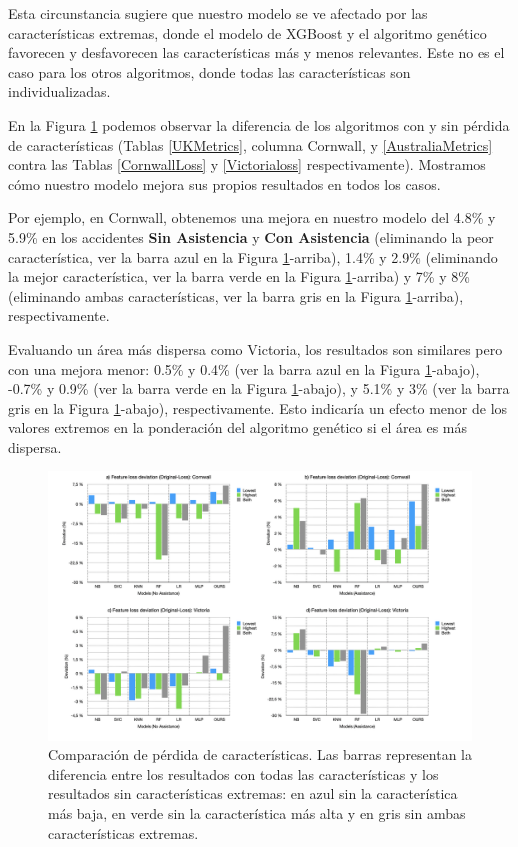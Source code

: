 \documentclass{uathesis-es}
\begin{document}
{		Esta circunstancia sugiere que nuestro modelo se ve afectado por las características extremas, donde el modelo de XGBoost y el algoritmo genético favorecen y desfavorecen las características más y menos relevantes. Este no es el caso para los otros algoritmos, donde todas las características son individualizadas.
		
		En la Figura \ref{lossFig} podemos observar la diferencia de los algoritmos con y sin pérdida de características (Tablas \ref{UKMetrics}, columna Cornwall, y \ref{AustraliaMetrics} contra las Tablas \ref{CornwallLoss} y \ref{Victorialoss} respectivamente). Mostramos cómo nuestro modelo mejora sus propios resultados en todos los casos.
		
		Por ejemplo, en Cornwall, obtenemos una mejora en nuestro modelo del 4.8\% y 5.9\% en los accidentes \textbf{Sin Asistencia} y \textbf{Con Asistencia} (eliminando la peor característica, ver la barra azul en la Figura \ref{lossFig}-arriba), 1.4\% y 2.9\% (eliminando la mejor característica, ver la barra verde en la Figura \ref{lossFig}-arriba) y 7\% y 8\% (eliminando ambas características, ver la barra gris en la Figura \ref{lossFig}-arriba), respectivamente.
		
		Evaluando un área más dispersa como Victoria, los resultados son similares pero con una mejora menor: 0.5\% y 0.4\% (ver la barra azul en la Figura \ref{lossFig}-abajo), -0.7\% y 0.9\% (ver la barra verde en la Figura \ref{lossFig}-abajo), y 5.1\% y 3\% (ver la barra gris en la Figura \ref{lossFig}-abajo), respectivamente. Esto indicaría un efecto menor de los valores extremos en la ponderación del algoritmo genético si el área es más dispersa.
		
		\begin{figure}[H]
			\centering
			\includegraphics[width=180mm]{Figures/LossFeatures/loss.png}
			\caption{Comparación de pérdida de características. Las barras representan la diferencia entre los resultados con todas las características y los resultados sin características extremas: en azul sin la característica más baja, en verde sin la característica más alta y en gris sin ambas características extremas.}
			\label{lossFig}
		\end{figure}
		
}
\end{document}
